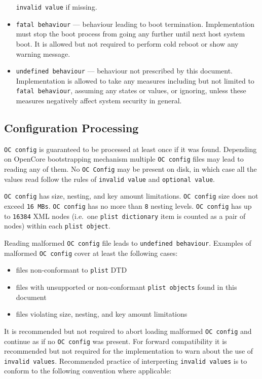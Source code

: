 \documentclass[]{article}
\providecommand{\tightlist}{%
  \setlength{\itemsep}{0pt}\setlength{\parskip}{0pt}}
\begin{document}
\begin{itemize}
  \texttt{invalid\ value} if missing.
\item
  \texttt{fatal\ behaviour} --- behaviour leading to boot termination.
  Implementation must stop the boot process from going any further until
  next host system boot. It is allowed but not required to perform cold
  reboot or show any warning message.
\item
  \texttt{undefined\ behaviour} --- behaviour not prescribed by this
  document. Implementation is allowed to take any measures including but
  not limited to \texttt{fatal\ behaviour}, assuming any states or
  values, or ignoring, unless these measures negatively affect system
  security in general.
\end{itemize}

\subsection{Configuration Processing}\label{configuration-processing}

\texttt{OC\ config} is guaranteed to be processed at least once if it
was found. Depending on OpenCore bootstrapping mechanism multiple
\texttt{OC\ config} files may lead to reading any of them. No
\texttt{OC\ Config} may be present on disk, in which case all the values
read follow the rules of \texttt{invalid\ value} and
\texttt{optional\ value}.

\texttt{OC\ config} has size, nesting, and key amount limitations.
\texttt{OC\ config} size does not exceed \texttt{16\ MBs}.
\texttt{OC\ config} has no more than \texttt{8} nesting levels.
\texttt{OC\ config} has up to \texttt{16384} XML nodes (i.e.~one
\texttt{plist\ dictionary} item is counted as a pair of nodes) within
each \texttt{plist\ object}.

Reading malformed \texttt{OC\ config} file leads to
\texttt{undefined\ behaviour}. Examples of malformed \texttt{OC\ config}
cover at least the following cases:

\begin{itemize}
\tightlist
\item
  files non-conformant to \texttt{plist} DTD
\item
  files with unsupported or non-conformant \texttt{plist\ objects} found
  in this document
\item
  files violating size, nesting, and key amount limitations
\end{itemize}

It is recommended but not required to abort loading malformed
\texttt{OC\ config} and continue as if no \texttt{OC\ config} was
present. For forward compatibility it is recommended but not required
for the implementation to warn about the use of
\texttt{invalid\ values}. Recommended practice of interpreting
\texttt{invalid\ values} is to conform to the following convention where
applicable:
\end{document}

